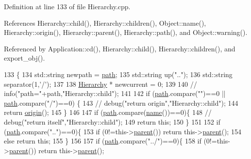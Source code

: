 Definition at line 133 of file Hierarchy.\+cpp.



References Hierarchy\+::child(), Hierarchy\+::children(), Object\+::name(), Hierarchy\+::origin(), Hierarchy\+::parent(), Hierarchy\+::path(), and Object\+::warning().



Referenced by Application\+::cd(), Hierarchy\+::child(), Hierarchy\+::children(), and export\+\_\+obj().


\begin{DoxyCode}
133                                          \{
134   std::string newpath = \hyperlink{classHierarchy_aa7990fa7caf132d83e361ce033c6c65a}{path};
135   std::string up(\textcolor{stringliteral}{".."});
136   std::string separator(1,\textcolor{charliteral}{'/'});
137 
138   \hyperlink{classHierarchy}{Hierarchy} * newcurrent = 0;
139 
140   \textcolor{comment}{//  info("path="+path,"Hierarchy::child");}
141 
142   \textcolor{keywordflow}{if} (\hyperlink{classHierarchy_aa7990fa7caf132d83e361ce033c6c65a}{path}.compare(\textcolor{stringliteral}{""})==0 || \hyperlink{classHierarchy_aa7990fa7caf132d83e361ce033c6c65a}{path}.compare(\textcolor{stringliteral}{"/"})==0) \{
143     \textcolor{comment}{//    debug("return origin","Hierarchy::child");}
144     \textcolor{keywordflow}{return} \hyperlink{classHierarchy_aee461dc930ce3871636ff87f075b1b83}{origin}();
145   \}
146 
147   \textcolor{keywordflow}{if} (\hyperlink{classHierarchy_aa7990fa7caf132d83e361ce033c6c65a}{path}.compare(\hyperlink{classObject_a300f4c05dd468c7bb8b3c968868443c1}{name}())==0)\{
148     \textcolor{comment}{//    debug("return itself","Hierarchy::child");}
149     \textcolor{keywordflow}{return} \textcolor{keyword}{this};
150   \}
151 
152   \textcolor{keywordflow}{if} (\hyperlink{classHierarchy_aa7990fa7caf132d83e361ce033c6c65a}{path}.compare(\textcolor{stringliteral}{".."})==0)\{
153     \textcolor{keywordflow}{if} (0!=this->\hyperlink{classHierarchy_a1c7bec8257e717f9c1465e06ebf845fc}{parent}()) \textcolor{keywordflow}{return} this->\hyperlink{classHierarchy_a1c7bec8257e717f9c1465e06ebf845fc}{parent}();
154     \textcolor{keywordflow}{else} \textcolor{keywordflow}{return} \textcolor{keyword}{this};
155   \}
156 
157   \textcolor{keywordflow}{if} (\hyperlink{classHierarchy_aa7990fa7caf132d83e361ce033c6c65a}{path}.compare(\textcolor{stringliteral}{"../"})==0)\{
158     \textcolor{keywordflow}{if} (0!=this->\hyperlink{classHierarchy_a1c7bec8257e717f9c1465e06ebf845fc}{parent}()) \textcolor{keywordflow}{return} this->\hyperlink{classHierarchy_a1c7bec8257e717f9c1465e06ebf845fc}{parent}();

\end{DoxyCode}

